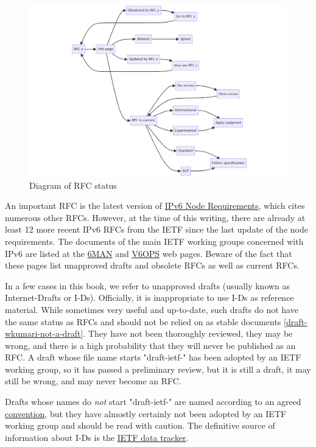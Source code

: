 \documentclass[
]{article}
\begin{document}
\begin{figure}
\centering
\includegraphics{rfc-diagram.png}
\caption{Diagram of RFC status}
\end{figure}

An important RFC is the latest version of
\href{https://www.rfc-editor.org/info/bcp220}{IPv6 Node Requirements},
which cites numerous other RFCs. However, at the time of this writing,
there are already at least 12 more recent IPv6 RFCs from the IETF since
the last update of the node requirements. The documents of the main IETF
working groups concerned with IPv6 are listed at the
\href{https://datatracker.ietf.org/wg/6man/documents/}{6MAN} and
\href{https://datatracker.ietf.org/wg/v6ops/documents/}{V6OPS} web
pages. Beware of the fact that these pages list unapproved drafts and
obsolete RFCs as well as current RFCs.

In a few cases in this book, we refer to unapproved drafts (usually
known as Internet-Drafts or I-Ds). Officially, it is inappropriate to
use I-Ds as reference material. While sometimes very useful and
up-to-date, such drafts do not have the same status as RFCs and should
not be relied on as stable documents
{[}\href{https://datatracker.ietf.org/doc/draft-wkumari-not-a-draft/}{draft-wkumari-not-a-draft}{]}.
They have not been thoroughly reviewed, they may be wrong, and there is
a high probability that they will never be published as an RFC. A draft
whose file name starts "draft-ietf-" has been adopted by an IETF working
group, so it has passed a preliminary review, but it is still a draft,
it may still be wrong, and may never become an RFC.

Drafts whose names do \emph{not} start "draft-ietf-" are named according
to an agreed
\href{https://authors.ietf.org/naming-your-internet-draft}{convention},
but they have almostly certainly not been adopted by an IETF working
group and should be read with caution. The definitive source of
information about I-Ds is the \href{https://datatracker.ietf.org/}{IETF
data tracker}.
\end{document}

